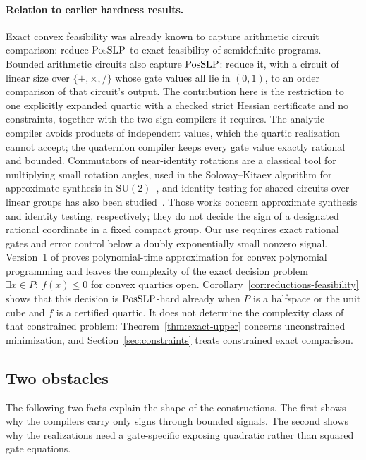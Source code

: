 \paragraph{Relation to earlier hardness results.}
Exact convex feasibility was already known to capture arithmetic circuit
comparison: \citet{TarasovVyalyi2008} reduce $\mathrm{PosSLP}$ to exact feasibility of
semidefinite programs. Bounded arithmetic circuits also capture $\mathrm{PosSLP}$:
\citet[Lemma~5]{EY2010} reduce it, with a circuit of linear size over
$\{+,\times,/\}$ whose gate values all lie in $(0,1)$, to an order comparison
of that circuit's output.
The contribution here is the restriction to one explicitly expanded
quartic with a checked strict Hessian certificate and no constraints, together
with the two sign compilers it requires. The analytic compiler avoids products
of independent values, which the quartic realization cannot accept; the
quaternion compiler keeps every gate value exactly rational and bounded.
Commutators of near-identity rotations are a classical tool for multiplying
small rotation angles, used in the Solovay--Kitaev algorithm for approximate
synthesis in $\mathrm{SU}(2)$~\cite{DawsonNielsen2006}, and identity testing
for shared circuits over linear groups has also been
studied~\cite{KoenigLohrey2015}.
Those works concern approximate synthesis and identity testing,
respectively; they do not decide the sign of a designated rational coordinate
in a fixed compact group. Our use requires exact rational gates and error
control below a doubly exponentially small nonzero signal.
Version~1 of \citet{SlotSteurerWiedmer2025} proves polynomial-time
approximation for convex polynomial programming and leaves the complexity of
the exact decision problem $\exists x\in P:\ f(x)\le0$ for convex quartics
open.
Corollary~\ref{cor:reductions-feasibility} shows that this decision is
$\mathrm{PosSLP}$-hard already when $P$ is a halfspace or the unit cube and $f$ is a
certified quartic. It does not determine the complexity class of that
constrained problem: Theorem~\ref{thm:exact-upper} concerns unconstrained
minimization, and Section~\ref{sec:constraints} treats constrained exact
comparison.

\subsection{Two obstacles}
\label{sec:reductions-obstacles}

The following two facts explain the shape of the constructions. The first
shows why the compilers carry only signs through bounded signals. The second
shows why the realizations need a gate-specific exposing quadratic rather than
squared gate equations.

